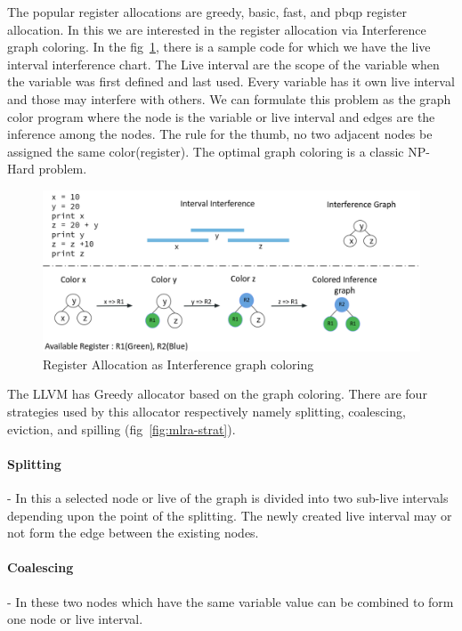 The popular register allocations are greedy, basic, fast, and pbqp register allocation. In this we are interested in the register allocation via Interference graph coloring. In the fig~\ref{fig:mlra-coloring}, there is a sample code for which we have the live interval interference chart. The Live interval are the scope of the variable when the variable was first defined and last used. Every variable has it own live interval and those may interfere with others. We can formulate this problem as the graph color program where the node is the variable or live interval and edges are the inference among the nodes. The rule for the thumb, no two adjacent nodes be assigned the same color(register). The optimal graph coloring is a classic NP-Hard problem. 

\begin{figure}[t]
    \centering
    \includegraphics[scale=0.4]{figures/chapter-5/mlra_coloring.png}
    \caption{Register Allocation as Interference graph coloring}
     \label{fig:mlra-coloring}
\end{figure}
The LLVM has Greedy allocator  based on the graph coloring. There are four strategies used by this allocator respectively namely splitting, coalescing, eviction, and spilling (fig~\ref{fig:mlra-strat}). 

\paragraph{Splitting} - In this a selected node or live of the graph is divided into two sub-live intervals depending upon the point of the splitting. The newly created live interval may or not form the edge between the existing nodes.

\paragraph{Coalescing} - In these two nodes which have the same variable value can be combined to form one node or live interval. 
